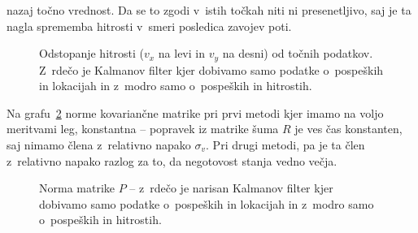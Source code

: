 \documentclass[a4paper,pdftex,10pt]{article}
\numberwithin{figure}{section} %
\begin{document}
nazaj točno vrednost. Da se to zgodi v~istih točkah niti ni presenetljivo, saj je ta nagla
sprememba hitrosti v~smeri posledica zavojev poti.
\begin{figure}[H]
    \centering
    \resizebox{.49\linewidth}{!}{}
    \resizebox{.49\linewidth}{!}{}
    \caption{Odstopanje hitrosti ($v_x$ na levi in $v_y$ na desni) od točnih podatkov. 
    Z~rdečo je Kalmanov filter kjer dobivamo samo podatke o~pospeških in lokacijah in 
    z~modro samo o~pospeških in hitrostih.}
    \label{slika7b}
\end{figure}
Na grafu~\ref{slika12} norme kovariančne matrike pri prvi metodi kjer imamo na voljo 
meritvami leg, konstantna -- popravek iz matrike šuma $R$ je ves čas konstanten, saj 
nimamo člena z~relativno napako $\sigma_v$. Pri drugi metodi, pa je ta člen z~relativno
napako razlog za to, da negotovost stanja vedno večja.
\begin{figure}[H]
    \centering
    \resizebox{.49\linewidth}{!}{}
    \caption{Norma matrike $P$ -- z~rdečo je narisan Kalmanov filter kjer dobivamo samo 
    podatke o~pospeških in lokacijah in z~modro samo o~pospeških in hitrostih.}
    \label{slika12}
\end{figure}

\end{document}
